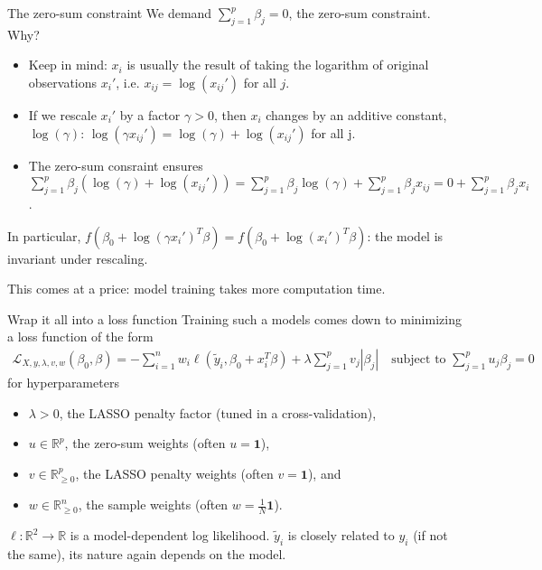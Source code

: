 \documentclass[10pt, aspectratio=169]{beamer}
\def\RR{\mathbb{R}}
\begin{document}
\begin{frame}{The zero-sum constraint}
  We demand $\sum_{j=1}^p \beta_j = 0$, the zero-sum constraint. Why?

  \begin{itemize}
    \item Keep in mind: $x_i$ is usually the result of taking the logarithm of original 
      observations $x_i'$, i.e. $x_{ij} = \log(x_{ij}')$ for all $j$.
    \item If we rescale $x_i'$ by a factor $\gamma > 0$, then $x_i$ changes by an additive 
      constant, $\log(\gamma)$: $\log(\gamma x_{ij}') = \log(\gamma) + \log(x_{ij}')$ for all j.
    \item The zero-sum consraint ensures $\sum_{j=1}^p \beta_j (\log(\gamma) + \log(x_{ij}')) = 
      \sum_{j=1}^p \beta_j \log(\gamma) + \sum_{j=1}^p \beta_j x_{ij} = 0 + \sum_{j=1}^p 
      \beta_j x_i$. 
  \end{itemize}
  
  In particular, $f(\beta_0 + \log(\gamma x_i')^T \beta) = f(\beta_0 + \log(x_i')^T \beta)$: the 
  model is \alert{invariant under rescaling}.

  This comes at a price: model training takes more computation time.
\end{frame}

\begin{frame}{Wrap it all into a loss function}
  Training such a models comes down to minimizing a loss function of the form 
  \begin{align}
    \mathcal{L}_{X, y, \lambda, v, w}(\beta_0, \beta) = -\sum_{i=1}^n w_i 
    \ell(\tilde{y}_i, \beta_0 + x_i^T \beta) + \lambda \sum_{j=1}^p v_j |\beta_j| 
    \quad \text{subject to } \sum_{j=1}^p u_j \beta_j = 0
  \end{align}
  for hyperparameters 
  \begin{itemize}
    \item $\lambda > 0$, the LASSO penalty factor (tuned in a cross-validation),
    \item $u \in \RR^p$, the zero-sum weights (often $u = \mathbf{1}$),
    \item $v \in \RR^p_{\geq 0}$, the LASSO penalty weights (often $v = \mathbf{1}$), and
    \item $w \in \RR^n_{\geq 0}$, the sample weights (often $w = \frac{1}{N} \mathbf{1}$).
  \end{itemize}

  $\ell: \RR^2 \to \RR$ is a model-dependent log likelihood. $\tilde{y}_i$ is closely 
  related to $y_i$ (if not the same), its nature again depends on the model.
\end{frame}
\end{document}

